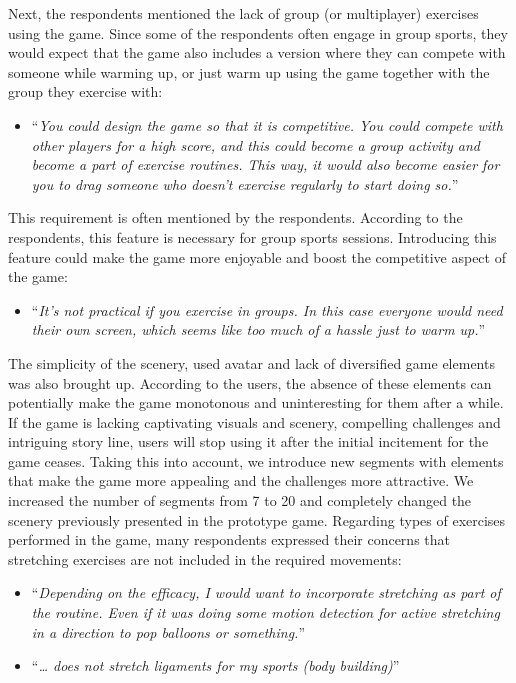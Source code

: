 Next, the respondents mentioned the lack of group (or multiplayer) exercises using the game. Since some of the respondents often engage in group sports, they would expect that the game also includes a version where they can compete with someone while warming up, or just warm up using the game together with the group they exercise with:
\begin{itemize}
\item ``\textit{You could design the game so that it is competitive. You could compete with other players for a high score, and this could become a group activity and become a part of exercise routines. This way, it would also become easier for you to drag someone who doesn't exercise regularly to start doing so.}''
\end{itemize}
This requirement is often mentioned by the respondents. According to the respondents, this feature is necessary for group sports sessions. Introducing this feature could make the game more enjoyable and boost the competitive aspect of the game:
\begin{itemize}
\item ``\textit{It's not practical if you exercise in groups. In this case everyone would need their own screen, which seems like too much of a hassle just to warm up.}''
\end{itemize}
The simplicity of the scenery, used avatar and lack of diversified game elements was also brought up. According to the users, the absence of these elements can potentially make the game monotonous and uninteresting for them after a while. If the game is lacking captivating visuals and scenery, compelling challenges and intriguing story line, users will stop using it after the initial incitement for the game ceases. Taking this into account, we introduce new segments with elements that make the game more appealing and the challenges more attractive. We increased the number of segments from 7 to 20 and completely changed the scenery previously presented in the prototype game. Regarding types of exercises performed in the game, many respondents expressed their concerns that stretching exercises are not included in the required movements: 
\begin{itemize}
\item ``\textit{Depending on the efficacy, I would want to incorporate stretching as part of the routine. Even if it was doing some motion detection for active stretching in a direction to pop balloons or something.}''
\item ``\textit{… does not stretch ligaments for my sports (body building)}''
\end{itemize}
